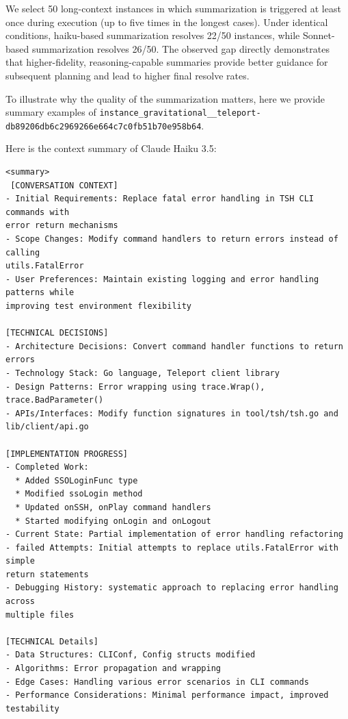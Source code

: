 We select 50 long-context instances in which summarization is triggered at least once during execution (up to five times in the longest cases).
Under identical conditions, haiku-based summarization resolves 22/50 instances, while Sonnet-based summarization resolves 26/50. The observed gap directly demonstrates that higher-fidelity, reasoning-capable summaries provide better guidance for subsequent planning and lead to higher final resolve rates.

To illustrate why the quality of the summarization matters, here we provide summary examples of \texttt{instance\_gravitational\_\_teleport-db89206db6c2969266e664c7c0fb51b70e958b64}.

Here is the context summary of Claude Haiku 3.5: 
\begin{tcolorbox}[colback=white,  %
                   colframe=black,    %
                   coltext=metablue,      %
                   breakable,
                   fontupper=\scriptsize\fontfamily{pcr}\selectfont]  %
\begin{verbatim}
<summary>
 [CONVERSATION CONTEXT]
- Initial Requirements: Replace fatal error handling in TSH CLI commands with 
error return mechanisms
- Scope Changes: Modify command handlers to return errors instead of calling 
utils.FatalError
- User Preferences: Maintain existing logging and error handling patterns while 
improving test environment flexibility

[TECHNICAL DECISIONS]
- Architecture Decisions: Convert command handler functions to return errors
- Technology Stack: Go language, Teleport client library
- Design Patterns: Error wrapping using trace.Wrap(), trace.BadParameter()
- APIs/Interfaces: Modify function signatures in tool/tsh/tsh.go and 
lib/client/api.go

[IMPLEMENTATION PROGRESS]
- Completed Work: 
  * Added SSOLoginFunc type
  * Modified ssoLogin method
  * Updated onSSH, onPlay command handlers
  * Started modifying onLogin and onLogout
- Current State: Partial implementation of error handling refactoring
- failed Attempts: Initial attempts to replace utils.FatalError with simple 
return statements
- Debugging History: systematic approach to replacing error handling across 
multiple files

[TECHNICAL Details]
- Data Structures: CLIConf, Config structs modified
- Algorithms: Error propagation and wrapping
- Edge Cases: Handling various error scenarios in CLI commands
- Performance Considerations: Minimal performance impact, improved testability


\end{verbatim}
\end{tcolorbox}
